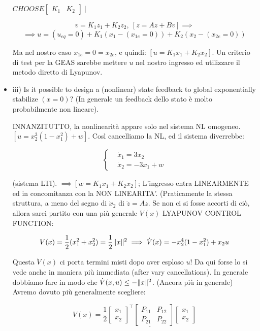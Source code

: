 \begin{itemize}
$CHOOSE \begin{bmatrix}K_1&K_2\end{bmatrix}\ |$

\[
	v = K_1z_1 + K_2z_2,\ [z = Az + Bv] \implies
\]
\[
	\implies u = (u_{eq}=0) + K_1(x_1-(x_{1e}=0)) + K_2(x_2-(x_{2e}=0))
\]

Ma nel nostro caso $x_{1e}=0=x_{2e}$, e quindi: $[u=K_1x_1+K_2x_2]$. Un criterio di test per la GEAS sarebbe mettere $u$ nel nostro ingresso ed utilizzare il metodo diretto di Lyapunov.

\item{iii)} Is it possible to design a (nonlinear) state feedback to global exponentially stabilize $(x=0)$? (In generale un feedback dello stato è molto probabilmente non lineare).

INNANZITUTTO, la nonlinearità appare solo nel sistema NL omogeneo. $[u=x_2^3(1-x_1^2)+w]$. Così cancelliamo la NL, ed il sistema diverrebbe:

\[
	\left\{
	\begin{aligned}
	&\dot{x}_1 = 3x_2\\
	&\dot{x}_2 = -3x_1 + w
	\end{aligned}
	\right.
\]

(sistema LTI). $\implies [w = K_1x_1 + K_2x_2]$; L'ingresso entra LINEARMENTE ed in concomitanza con la NON LINEARITA'. (Praticamente la stessa struttura, a meno del segno di $\dot{x}_2$ di $\dot{z}=Az$. Se non ci si fosse accorti di ciò, allora sarei partito con una più generale $V(x)$ LYAPUNOV CONTROL FUNCTION:

\[
	V(x) = \frac{1}{2}(x_1^2 + x_2^2) = \frac{1}{2}\lVert x\rVert^2 \implies \dot{V}(x) = -x_2^4(1-x_1^2) +x_2u
\]

Questa $\dot{V}(x)$ ci porta termini misti dopo aver esploso $u$!
Da qui forse lo si vede anche in maniera più immediata (after vary cancellations). In generale dobbiamo fare in modo che $\dot{V}(x,u) \leq -\lVert x\rVert^2$.
(Ancora più in generale) Avremo dovuto più generalmente scegliere:

\[
	V(x) = \underline{\frac{1}{2}\begin{bmatrix}x_1\\x_2\end{bmatrix}^\top\begin{bmatrix}P_{11}&P_{12}\\P_{21}&P_{22}\end{bmatrix}\begin{bmatrix}x_1\\x_2\end{bmatrix}}
\]


\end{itemize}
